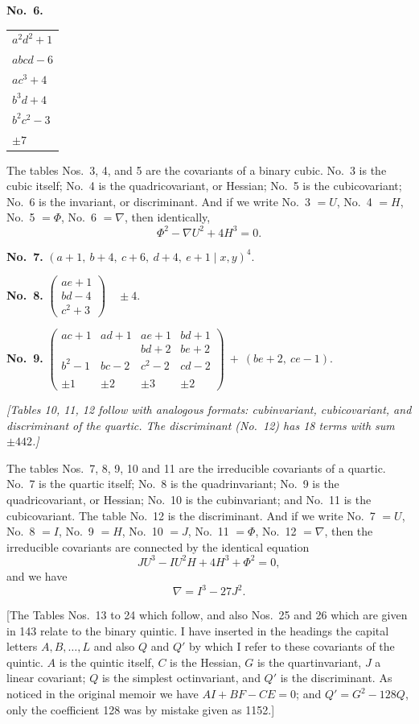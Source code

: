 \documentclass[11pt]{article}
\begin{document}
\textbf{No.~6.} \quad
\begin{tabular}{l}
$a^2 d^2 + 1$ \\
$abcd - 6$ \\
$ac^3 + 4$ \\
$b^3 d + 4$ \\
$b^2 c^2 - 3$ \\
\hline
$\pm 7$
\end{tabular}

The tables Nos.~3, 4, and 5 are the covariants of a binary cubic. No.~3 is the cubic itself; No.~4 is the quadricovariant, or Hessian; No.~5 is the cubicovariant; No.~6 is the invariant, or discriminant. And if we write No.~3 $= U$, No.~4 $= H$, No.~5 $= \Phi$, No.~6 $= \nabla$, then identically,
\[
\Phi^2 - \nabla U^2 + 4 H^3 = 0.
\]

\textbf{No.~7.} \quad $(a+1,\ b+4,\ c+6,\ d+4,\ e+1 \mid x, y)^4$.

\textbf{No.~8.} \quad
$\left(\begin{array}{c} ae + 1 \\ bd - 4 \\ c^2 + 3 \end{array}\right) \quad \pm 4$.

\textbf{No.~9.} \quad
$\left(\begin{array}{cccc} ac + 1 & ad + 1 & ae + 1 & bd + 1 \\ & & bd + 2 & be + 2 \\ b^2 - 1 & bc - 2 & c^2 - 2 & cd - 2 \\ & & & \\ \pm 1 & \pm 2 & \pm 3 & \pm 2 \end{array}\right)\ +\ (be + 2,\ ce - 1)$.

\textit{[Tables 10, 11, 12 follow with analogous formats: cubinvariant, cubicovariant, and discriminant of the quartic. The discriminant (No.~12) has 18 terms with sum $\pm 442$.]}

The tables Nos.~7, 8, 9, 10 and 11 are the irreducible covariants of a quartic. No.~7 is the quartic itself; No.~8 is the quadrinvariant; No.~9 is the quadricovariant, or Hessian; No.~10 is the cubinvariant; and No.~11 is the cubicovariant. The table No.~12 is the discriminant. And if we write No.~7 $= U$, No.~8 $= I$, No.~9 $= H$, No.~10 $= J$, No.~11 $= \Phi$, No.~12 $= \nabla$, then the irreducible covariants are connected by the identical equation
\[
JU^3 - IU^2 H + 4 H^3 + \Phi^2 = 0,
\]
and we have
\[
\nabla = I^3 - 27 J^2.
\]

[The Tables Nos.~13 to 24 which follow, and also Nos.~25 and 26 which are given in 143 relate to the binary quintic. I have inserted in the headings the capital letters $A, B, \ldots, L$ and also $Q$ and $Q'$ by which I refer to these covariants of the quintic. $A$ is the quintic itself, $C$ is the Hessian, $G$ is the quartinvariant, $J$ a linear covariant; $Q$ is the simplest octinvariant, and $Q'$ is the discriminant. As noticed in the original memoir we have $AI + BF - CE = 0$; and $Q' = G^2 - 128 Q$, only the coefficient 128 was by mistake given as 1152.]
\end{document}
